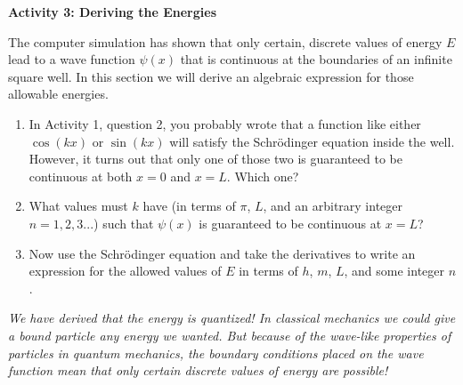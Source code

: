 \textbf{Activity 3: Deriving the Energies}

The computer simulation has shown that only certain, discrete values of energy $E$ lead to a wave function $\psi(x)$ that is continuous at the boundaries of an infinite square well.  In this section we will derive an algebraic expression for those allowable energies.

\begin{enumerate}[wide]
\item In Activity 1, question 2, you probably wrote that a function like either $\cos(kx)$ or $\sin(kx)$ will satisfy the Schr\"odinger equation inside the well. However, it turns out that only one of those two is guaranteed to be continuous at both $x=0$ and $x=L$.  Which one?
\answerspace{0.3in}

\item What values must $k$ have (in terms of $\pi$, $L$, and an arbitrary integer $n=1,2,3...$) such that $\psi(x)$ is guaranteed to be continuous at $x=L$?  
\answerspace{0.3in}

\item Now use the Schr\"odinger equation and take the derivatives to write an expression for the allowed values of $E$ in terms of $h$, $m$, $L$, and some integer $n$.  
\answerspace{2.0in}
\end{enumerate}

\textit{We have derived that the energy is quantized!  In classical mechanics we could give a bound particle any energy we wanted.  But because of the wave-like properties of particles in quantum mechanics, the boundary conditions placed on the wave function mean that only certain discrete values of energy are possible!}

\pagebreak

